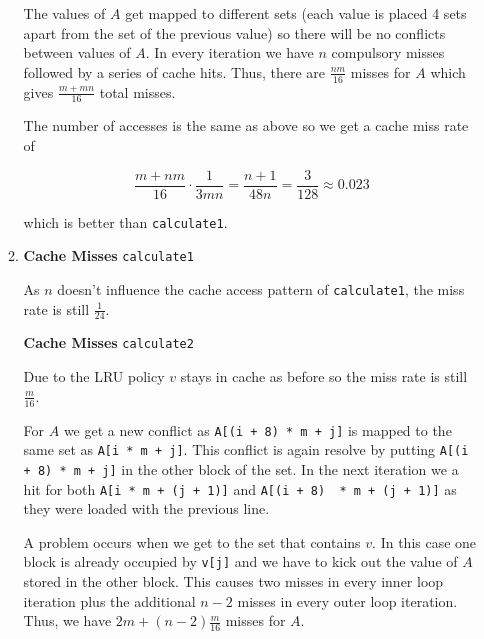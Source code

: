 \documentclass[a4paper]{article}
\begin{document}
\begin{enumerate}
\begin{enumerate}
                  The values of $A$ get mapped to different sets (each value is
                  placed 4 sets apart from the set of the previous value) so
                  there will be no conflicts between values of $A$. In every
                   iteration we have $n$ compulsory misses followed by
                  a series of cache hits. Thus, there are
                  $\frac{nm}{16}$ misses for $A$ which gives
                  $\frac{m+mn}{16}$ total misses.

                  The number of accesses is the same as above so we get a cache
                  miss rate of
                  
                  \begin{equation*}
                      \frac{m+nm}{16} \cdot \frac{1}{3mn} = \frac{n+1}{48n}
                      = \frac{3}{128} \approx 0.023
                  \end{equation*}

                  which is better than \verb|calculate1|.
              \item 
                \textbf{Cache Misses} \verb|calculate1| \vspace{1mm} 

                As $n$ doesn't influence the cache access pattern of
                \verb|calculate1|, the miss rate is still
                $\frac{1}{24}$.
                \vspace{1mm}

                \textbf{Cache Misses} \verb|calculate2| \vspace{1mm} 

                Due to the LRU policy $v$ stays in cache as before so the miss
                rate is still $\frac{m}{16}$. 

                For $A$ we get a new conflict as
                \verb|A[(i + 8) * m + j]| is mapped to the same set as
                \verb|A[i * m + j]|. This conflict is again resolve by putting 
                \verb|A[(i + 8) * m + j]| in the other block of the set. In the 
                next iteration we a hit for both \verb|A[i * m + (j + 1)]| and 
                \verb|A[(i + 8)  * m + (j + 1)]| as they were loaded with the
                previous line.

                A problem occurs when we get to the set that contains $v$. In
                this case one block is already occupied by \verb|v[j]| and we
                have to kick out the value of $A$ stored in the other block.
                This causes two misses in every inner loop iteration plus the
                additional $n-2$ misses in every  outer loop iteration. 
                Thus, we have $2m+(n-2)\frac{m}{16}$ misses for $A$.


\end{enumerate}
\end{enumerate}
\end{document}
